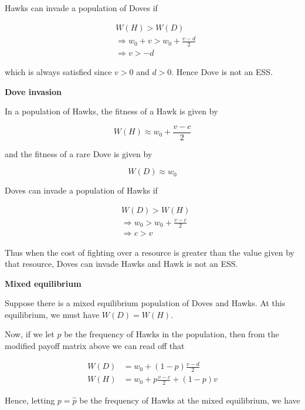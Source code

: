 \documentclass{article}
\begin{document}
Hawks can invade a population of Doves if

\begin{align*}
    &W(H) > W(D) \\
    &\Rightarrow w_0 + v > w_0 + \frac{v - d}{2} \\
    &\Rightarrow v > - d
\end{align*}

which is always satisfied since $v > 0$ and $d > 0$. Hence Dove is not
an ESS.

\textbf{Dove invasion}

In a population of Hawks, the fitness of a Hawk is given by

\begin{equation*}
    W(H) \approx w_0 + \frac{v - c}{2}
\end{equation*}

and the fitness of a rare Dove is given by

\begin{equation*}
    W(D) \approx w_0
\end{equation*}

Doves can invade a population of Hawks if

\begin{align*}
    &W(D) > W(H) \\
    &\Rightarrow w_0 > w_0 + \frac{v - c}{2} \\
    &\Rightarrow c > v
\end{align*}

Thus when the cost of fighting over a resource is greater than the value
given by that resource, Doves can invade Hawks and Hawk is not an ESS.

\textbf{Mixed equilibrium}

Suppose there is a mixed equilibrium population of Doves and Hawks. At
this equilibrium, we must have $W(D) = W(H)$.

Now, if we let $p$ be the frequency of Hawks in the population, then
from the modified payoff matrix above we can read off that

\begin{align*}
    W(D) &= w_0 + (1 - p) \frac{v - d}{2} \\
    W(H) &= w_0 + p \frac{v - c}{2} + (1 - p) v
\end{align*}

Hence, letting $p = \hat{p}$ be the frequency of Hawks at the mixed
equilibrium, we have
\end{document}

